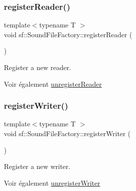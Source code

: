 \subsubsection{\texorpdfstring{register\+Reader()}{registerReader()}}
{\footnotesize\ttfamily template$<$typename T $>$ \\
void sf\+::\+Sound\+File\+Factory\+::register\+Reader (\begin{DoxyParamCaption}{ }\end{DoxyParamCaption})\hspace{0.3cm}{\ttfamily [static]}}



Register a new reader. 

\begin{DoxySeeAlso}{Voir également}
\hyperlink{classsf_1_1SoundFileFactory_a9e6765c41e2784bc755388afb4a2f432}{unregister\+Reader} 
\end{DoxySeeAlso}
\mbox{\label{classsf_1_1SoundFileFactory_a3a59140e6ccf1f252f721b790eddd661}} 
\subsubsection{\texorpdfstring{register\+Writer()}{registerWriter()}}
{\footnotesize\ttfamily template$<$typename T $>$ \\
void sf\+::\+Sound\+File\+Factory\+::register\+Writer (\begin{DoxyParamCaption}{ }\end{DoxyParamCaption})\hspace{0.3cm}{\ttfamily [static]}}



Register a new writer. 

\begin{DoxySeeAlso}{Voir également}
\hyperlink{classsf_1_1SoundFileFactory_a2306f90d1f72e474732e4bcceeb34215}{unregister\+Writer} 
\end{DoxySeeAlso}
\mbox{\label{classsf_1_1SoundFileFactory_a9e6765c41e2784bc755388afb4a2f432}} 
